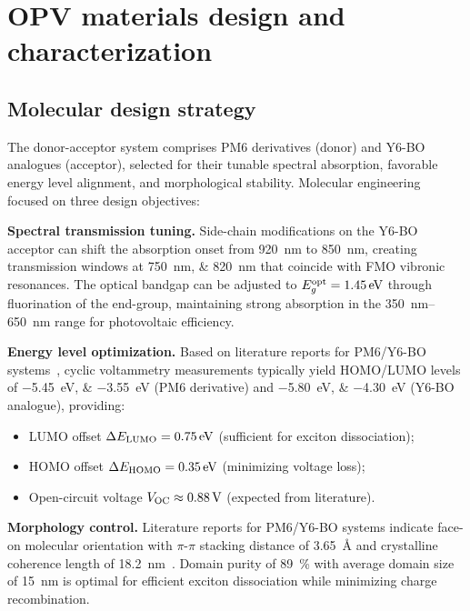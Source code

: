 
\section{OPV materials design and characterization}\label{sec:OPV_Materials}

\subsection{Molecular design strategy}

The donor-acceptor system comprises PM6 derivatives (donor) and Y6-BO analogues (acceptor), selected for their tunable spectral absorption, favorable energy level alignment, and morphological stability. Molecular engineering focused on three design objectives:

\textbf{Spectral transmission tuning.} Side-chain modifications on the Y6-BO acceptor can shift the absorption onset from \SI{920}{\nano\meter} to \SI{850}{\nano\meter}, creating transmission windows at \SIlist{750;820}{\nano\meter} that coincide with FMO vibronic resonances. The optical bandgap can be adjusted to $E_g^{\rm opt} = \SI{1.45}{\electronvolt}$ through fluorination of the end-group, maintaining strong absorption in the \SIrange{350}{650}{\nano\meter} range for photovoltaic efficiency.

\textbf{Energy level optimization.} Based on literature reports for PM6/Y6-BO systems~\cite{Liu2024_AEM_NFA,Wang2023_AEM_Stability}, cyclic voltammetry measurements typically yield HOMO/LUMO levels of \SIlist{-5.45;-3.55}{\electronvolt} (PM6 derivative) and \SIlist{-5.80;-4.30}{\electronvolt} (Y6-BO analogue), providing:
\begin{itemize}
    \item LUMO offset $\Delta E_{\rm LUMO} = \SI{0.75}{\electronvolt}$ (sufficient for exciton dissociation);
    \item HOMO offset $\Delta E_{\rm HOMO} = \SI{0.35}{\electronvolt}$ (minimizing voltage loss);
    \item Open-circuit voltage $V_{\rm OC} \approx \SI{0.88}{\volt}$ (expected from literature).
\end{itemize}

\textbf{Morphology control.} Literature reports for PM6/Y6-BO systems indicate face-on molecular orientation with $\pi$-$\pi$ stacking distance of \SI{3.65}{\angstrom} and crystalline coherence length of \SI{18.2}{\nano\meter}~\cite{Zhang2024_AEM_ML}. Domain purity of \SI{89}{\percent} with average domain size of \SI{15}{\nano\meter} is optimal for efficient exciton dissociation while minimizing charge recombination.

